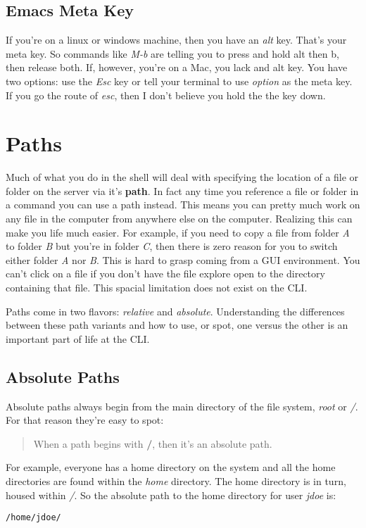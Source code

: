 \documentclass[]{tufte-handout}
\begin{document}
\subsection{Emacs Meta Key}

If you're on a linux or windows machine, then you have an \textit{alt} key. That's your meta key. So commands like \textit{M-b} are telling you to press and hold alt then b, then release both. If, however, you're on a Mac, you lack and alt key. You have two options: use the \textit{Esc} key or tell your terminal to use \textit{option} as the meta key.  If you go the route of \textit{esc}, then I don't believe you hold the the key down.



\section{Paths}

Much of what you do in the shell will deal with specifying the location of a file or folder on the server via it's \textbf{path}. In fact any time you reference a file or folder in a command you can use a path instead. This means you can pretty much work on any file in the computer from anywhere else on the computer. Realizing this can make you life much easier. For example, if you need to copy a file from folder \textit{A} to folder \textit{B} but you're in folder \textit{C}, then there is zero reason for you to switch either folder \textit{A} nor \textit{B}. This is hard to grasp coming from a GUI environment. You can't click on a file if you don't have the file explore open to the directory containing that file.  This spacial limitation does not exist on the CLI. 

Paths come in two flavors: \textit{relative} and \textit{absolute}. Understanding the differences between these path variants and how to use, or spot, one versus the other is an important part of life at the CLI.

\subsection{Absolute Paths}

Absolute paths always begin from the main directory of the file system, \textit{root} or \textit{/}.  For that reason they're easy to spot:
\begin{quote}
When a path begins with \textbf{/}, then it's an absolute path. 
\end{quote} 
For example, everyone has a home directory on the system and all the home directories are found within the \textit{home} directory. The home directory is in turn, housed within \textit{/}. So the absolute path to the home directory for user \textit{jdoe} is:
\begin{verbatim}
/home/jdoe/
\end{verbatim}
\end{document}
